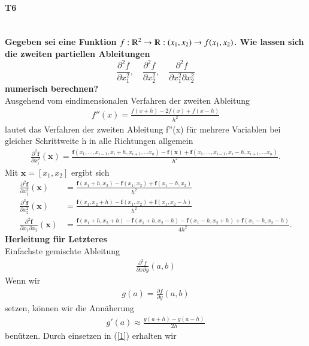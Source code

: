 \documentclass[10pt,a4paper]{article}
\begin{document}
	\paragraph{T6}\mbox{}\\
	\textbf{Gegeben sei eine Funktion $f:\varmathbb{R}^2\rightarrow \varmathbb{R}: (x_1,x_2)\rightarrow f(x_1,x_2)$. Wie lassen sich die zweiten partiellen Ableitungen $$
		\frac{\partial^2 f}{\partial x_1^2}, \quad
		\frac{\partial^2 f}{\partial x_2^2}, \quad
		\frac{\partial^2 f}{\partial x_1^2 \partial x_2^2}
	$$ numerisch berechnen?} \\
	Ausgehend vom eindimensionalen Verfahren der zweiten Ableitung
	\begin{align*}
		f''(x)=\frac{f(x+h)-2f(x)+f(x-h)}{h^2}
	\end{align*}
	lautet das Verfahren der zweiten Ableitung f''(x) für mehrere Variablen bei gleicher Schrittweite h in alle Richtungen allgemein
	\begin{align*}
		\frac{\partial^2 \textbf{f}}{\partial x_i^2}(\textbf{x}) = \frac{\textbf{f}(x_1,\dots, x_{i-1},x_i+h,x_{i+1},\dots x_n)-\textbf{f}(\textbf{x})+\textbf{f}(x_1,\dots, x_{i-1},x_i-h,x_{i+1},\dots x_n)}{h^2}.
	\end{align*}
	Mit $\textbf{x} = [x_1, x_2]$ ergibt sich
	\begin{align*}
		\frac{\partial^2 \textbf{f}}{\partial x_1^2}(\textbf{x}) &= \frac{\textbf{f}(x_1+h,x_2)-\textbf{f}(x_1, x_2)+\textbf{f}(x_1-h,x_2)}{h^2}\\
		\frac{\partial^2 \textbf{f}}{\partial x_2^2}(\textbf{x}) &= \frac{\textbf{f}(x_1,x_2+h)-\textbf{f}(x_1, x_2)+\textbf{f}(x_1,x_2-h)}{h^2}\\
		\frac{\partial^2 \textbf{f}}{\partial x_1\partial x_2}(\textbf{x}) &=\frac{\textbf{f}(x_1+h,x_2+h)-\textbf{f}(x_1+h, x_2-h)-\textbf{f}(x_1-h, x_2+h)+\textbf{f}(x_1-h,x_2-h)}{4h^2}.
	\end{align*}
	\textbf{Herleitung für Letzteres} \\
	Einfachste gemischte Ableitung
	\begin{align*}
		\frac{\partial^2 f}{\partial x \partial y}(a,b)
	\end{align*}
	Wenn wir
	\begin{align}\label{1}
		g(a)=\frac{\partial f}{\partial y}(a,b)
	\end{align}
	setzen, können wir die Annäherung
	\begin{align*}
		g'(a)\approx\frac{g(a+h)-g(a-h)}{2h}
	\end{align*}
	benützen. Durch einsetzen in (\ref{1}) erhalten wir
\end{document}
